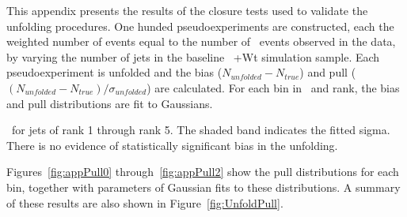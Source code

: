 This appendix presents the results of the closure tests used to validate the unfolding
procedures.  One hunded pseudoexperiments are constructed, each the weighted
number of events equal to the number of \emubb\ events observed in the data,
by varying the number of jets in the  baseline \ttbar\ +Wt simulation sample.
Each pseudoexperiment is unfolded and the bias ($N_{unfolded}-N_{true}$) and
pull ($(N_{unfolded}-N_{true})/\sigma_{unfolded}$) are calculated.  For each
bin in \pT\ and rank, the bias and pull distributions are fit to Gaussians.

\pT\ for jets of rank 1 through rank 5.  The shaded band indicates the fitted
sigma.  There is no evidence of statistically significant bias in the unfolding.

Figures~\ref{fig:appPull0} through~\ref{fig:appPull2} show the pull distributions 
for each bin, together with parameters of Gaussian fits to these distributions.
A summary of these results are also shown in Figure~\ref{fig:UnfoldPull}.  



\clearpage

